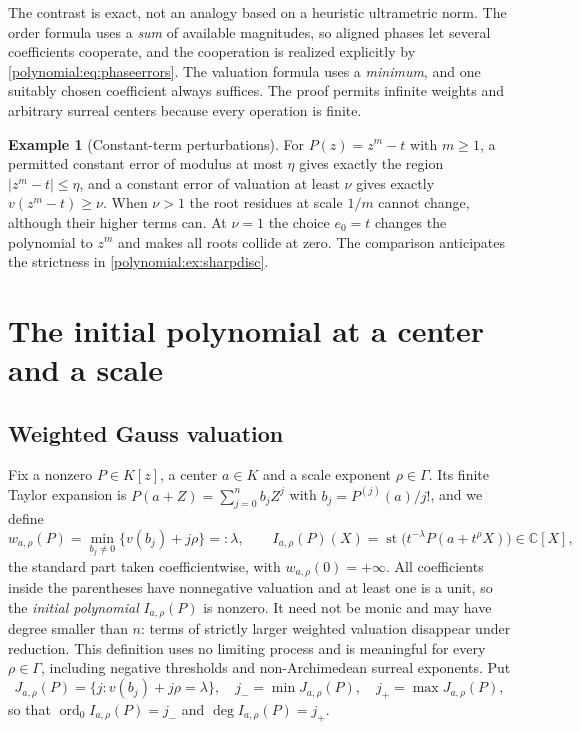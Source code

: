 \documentclass[11pt,letterpaper]{article}
\numberwithin{equation}{section}
\theoremstyle{definition}
\newtheorem{example}[theorem]{Example}
\theoremstyle{remark}\newtheorem{remark}[theorem]{Remark}
\newcommand{\C}{\mathbb C}
\newcommand{\st}{\operatorname{st}}
\newcommand{\ord}{\operatorname{ord}}
\begin{document}
The contrast is exact, not an analogy based on a heuristic ultrametric norm.
The order formula uses a \emph{sum} of available magnitudes, so aligned phases
let several coefficients cooperate, and the cooperation is realized explicitly
by \eqref{polynomial:eq:phaseerrors}. The valuation formula uses a
\emph{minimum}, and one suitably chosen coefficient always suffices. The proof
permits infinite weights and arbitrary surreal centers because every operation
is finite.

\begin{example}[Constant-term perturbations]\label{polynomial:ex:constantuncertainty}
For $P(z)=z^m-t$ with $m\ge1$, a permitted constant error of modulus at most
$\eta$ gives exactly the region $|z^m-t|\le\eta$, and a constant error of
valuation at least $\nu$ gives exactly $v(z^m-t)\ge\nu$. When $\nu>1$ the root
residues at scale $1/m$ cannot change, although their higher terms can. At
$\nu=1$ the choice $e_0=t$ changes the polynomial to $z^m$ and makes all roots
collide at zero. The comparison anticipates the strictness in
\cref{polynomial:ex:sharpdisc}.
\end{example}

\section{The initial polynomial at a center and a scale}
\label{polynomial:sec:initial}

\subsection{Weighted Gauss valuation}\label{polynomial:subsec:gauss}
Fix a nonzero $P\in K[z]$, a center $a\in K$ and a scale exponent
$\rho\in\Gamma$. Its finite Taylor expansion is
$P(a+Z)=\sum_{j=0}^nb_jZ^j$ with $b_j=P^{(j)}(a)/j!$, and we define
\begin{equation}\label{polynomial:eq:weighted}
 w_{a,\rho}(P)=\min_{b_j\ne0}\{v(b_j)+j\rho\}=:\lambda,
 \qquad
 I_{a,\rho}(P)(X)=\st\bigl(t^{-\lambda}P(a+t^\rho X)\bigr)\in\C[X],
\end{equation}
the standard part taken coefficientwise, with $w_{a,\rho}(0)=+\infty$. All
coefficients inside the parentheses have nonnegative valuation and at least
one is a unit, so the \emph{initial polynomial} $I_{a,\rho}(P)$ is nonzero. It
need not be monic and may have degree smaller than $n$: terms of strictly
larger weighted valuation disappear under reduction. This definition uses no
limiting process and is meaningful for every $\rho\in\Gamma$, including
negative thresholds and non-Archimedean surreal exponents. Put
\begin{equation}\label{polynomial:eq:active}
 J_{a,\rho}(P)=\{j:v(b_j)+j\rho=\lambda\},\quad
 j_-=\min J_{a,\rho}(P),\quad j_+=\max J_{a,\rho}(P),
\end{equation}
so that $\ord_0I_{a,\rho}(P)=j_-$ and $\deg I_{a,\rho}(P)=j_+$.
\end{document}
